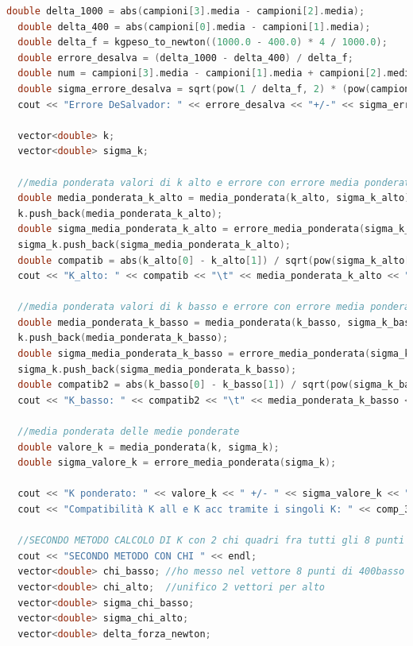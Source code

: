 \documentclass[a4paper,11pt,oneside]{article}
\begin{document}
\begin{lstlisting}[language=C++, label=lst:analisi_2ac, caption=analisi\_2ac]
  double delta_1000 = abs(campioni[3].media - campioni[2].media);
  double delta_400 = abs(campioni[0].media - campioni[1].media);
  double delta_f = kgpeso_to_newton((1000.0 - 400.0) * 4 / 1000.0);
  double errore_desalva = (delta_1000 - delta_400) / delta_f;
  double num = campioni[3].media - campioni[1].media + campioni[2].media - campioni[0].media;
  double sigma_errore_desalva = sqrt(pow(1 / delta_f, 2) * (pow(campioni[0].dstd_media, 2) + pow(campioni[1].dstd_media, 2) + pow(campioni[2].dstd_media, 2) + pow(campioni[3].dstd_media, 2)) + 2 * pow(num * sigma_delta_forza / pow(delta_f, 2), 2));
  cout << "Errore DeSalvador: " << errore_desalva << "+/-" << sigma_errore_desalva << "micron/Newton" << endl;
  
  vector<double> k;
  vector<double> sigma_k;

  //media ponderata valori di k alto e errore con errore media ponderata
  double media_ponderata_k_alto = media_ponderata(k_alto, sigma_k_alto); //valori k
  k.push_back(media_ponderata_k_alto);
  double sigma_media_ponderata_k_alto = errore_media_ponderata(sigma_k_alto); //errori k
  sigma_k.push_back(sigma_media_ponderata_k_alto);
  double compatib = abs(k_alto[0] - k_alto[1]) / sqrt(pow(sigma_k_alto[0], 2) + pow(sigma_k_alto[1], 2));
  cout << "K_alto: " << compatib << "\t" << media_ponderata_k_alto << "\t" << sigma_media_ponderata_k_alto << endl;
  
  //media ponderata valori di k basso e errore con errore media ponderata
  double media_ponderata_k_basso = media_ponderata(k_basso, sigma_k_basso);
  k.push_back(media_ponderata_k_basso);
  double sigma_media_ponderata_k_basso = errore_media_ponderata(sigma_k_basso);
  sigma_k.push_back(sigma_media_ponderata_k_basso);
  double compatib2 = abs(k_basso[0] - k_basso[1]) / sqrt(pow(sigma_k_basso[0], 2) + pow(sigma_k_basso[1], 2));
  cout << "K_basso: " << compatib2 << "\t" << media_ponderata_k_basso << "\t" << sigma_media_ponderata_k_basso << endl;
  
  //media ponderata delle medie ponderate
  double valore_k = media_ponderata(k, sigma_k);
  double sigma_valore_k = errore_media_ponderata(sigma_k);

  cout << "K ponderato: " << valore_k << " +/- " << sigma_valore_k << " micron/Newton" << endl;
  cout << "Compatibilità K all e K acc tramite i singoli K: " << comp_3(media_ponderata_k_alto, media_ponderata_k_basso, sigma_media_ponderata_k_alto, sigma_media_ponderata_k_basso) << endl;

  //SECONDO METODO CALCOLO DI K con 2 chi quadri fra tutti gli 8 punti
  cout << "SECONDO METODO CON CHI " << endl;
  vector<double> chi_basso; //ho messo nel vettore 8 punti di 400basso
  vector<double> chi_alto;  //unifico 2 vettori per alto
  vector<double> sigma_chi_basso;
  vector<double> sigma_chi_alto;
  vector<double> delta_forza_newton;


\end{lstlisting}
\end{document}
